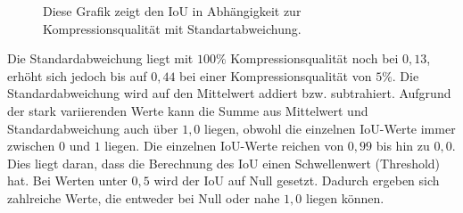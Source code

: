 \newpage
            \begin{figure}[!htb]
                \centering
                
                \caption{Diese Grafik zeigt den IoU in Abhängigkeit zur Kompressionsqualität mit Standartabweichung.}
                \label{fig:iou_std}
            \end{figure}
            
            Die Standardabweichung liegt mit $100\%$ Kompressionsqualität noch bei $0,13$, erhöht sich jedoch bis auf $0,44$ bei einer Kompressionsqualität von $5\%$. Die Standardabweichung wird auf den Mittelwert addiert  bzw. subtrahiert. Aufgrund der stark variierenden Werte kann die Summe aus Mittelwert und Standardabweichung auch über $1,0$ liegen, obwohl die einzelnen IoU-Werte immer zwischen $0$ und $1$ liegen. Die einzelnen IoU-Werte reichen von $0,99$ bis hin zu $0,0$.
            Dies liegt daran, dass die Berechnung des IoU einen Schwellenwert (Threshold) hat. Bei Werten unter $0,5$ wird der IoU auf Null gesetzt. Dadurch ergeben sich zahlreiche Werte, die entweder bei Null oder nahe $1,0$ liegen können.\\
\newpage
